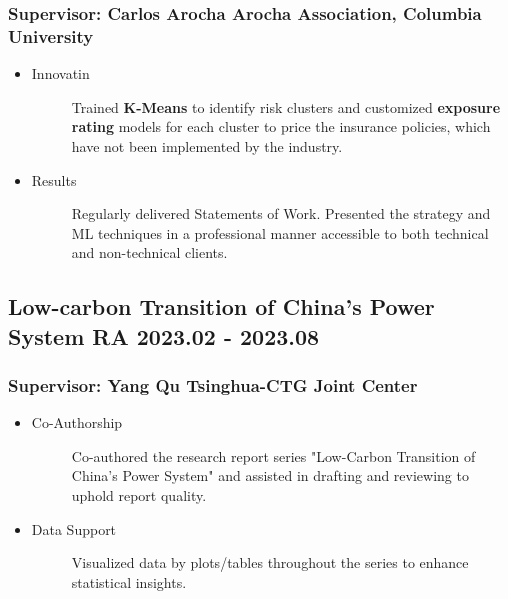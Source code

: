 \documentclass[a4paper]{article}
\begin{document}
\subsubsection{Supervisor: Carlos Arocha \hfill Arocha Association, Columbia University} 
\begin{itemize}
    \item\begin{description}
        \item[Innovatin] Trained \textbf{K-Means} to identify risk clusters and customized \textbf{exposure rating} models for each cluster to price the insurance policies, which have not been implemented by the industry.
    \end{description}
    \item\begin{description}
        \item[Results] Regularly delivered Statements of Work. Presented the strategy and ML techniques in a professional manner accessible to both technical and non-technical clients.
    \end{description}
\end{itemize} 

\subsection{Low-carbon Transition of China's Power System \normalfont \hfill RA \hspace{40pt} 2023.02 - 2023.08} 
\subsubsection{Supervisor:  Yang Qu \hfill Tsinghua-CTG Joint Center} 

\begin{itemize}
    \item \begin{description}
        \item[Co-Authorship] Co-authored the research report series "Low-Carbon Transition of China’s Power System" and assisted in drafting and reviewing to uphold report quality.
    \end{description}
    \item \begin{description}
        \item[Data Support] Visualized data by plots/tables throughout the series to enhance statistical insights.
    \end{description} 
\end{itemize}
\end{document}

